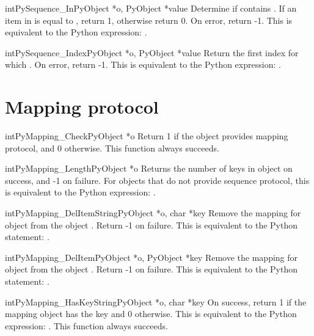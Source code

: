      \begin{cfuncdesc}{int}{PySequence_In}{PyObject *o, PyObject *value}
	 Determine if  contains .  If an item in  is equal to
	 , return 1, otherwise return 0.  On error, return -1.  This
	 is equivalent to the Python expression: .
     \end{cfuncdesc}

     \begin{cfuncdesc}{int}{PySequence_Index}{PyObject *o, PyObject *value}
	 Return the first index for which .  On error,
	 return -1.    This is equivalent to the Python
	 expression: .
     \end{cfuncdesc}

\section{Mapping protocol}

     \begin{cfuncdesc}{int}{PyMapping_Check}{PyObject *o}
         Return 1 if the object provides mapping protocol, and 0
	 otherwise.  
	 This function always succeeds.
     \end{cfuncdesc}


     \begin{cfuncdesc}{int}{PyMapping_Length}{PyObject *o}
         Returns the number of keys in object  on success, and -1 on
	 failure.  For objects that do not provide sequence protocol,
	 this is equivalent to the Python expression: .
     \end{cfuncdesc}


     \begin{cfuncdesc}{int}{PyMapping_DelItemString}{PyObject *o, char *key}
	 Remove the mapping for object  from the object .
	 Return -1 on failure.  This is equivalent to
	 the Python statement: .
     \end{cfuncdesc}


     \begin{cfuncdesc}{int}{PyMapping_DelItem}{PyObject *o, PyObject *key}
	 Remove the mapping for object  from the object .
	 Return -1 on failure.  This is equivalent to
	 the Python statement: .
     \end{cfuncdesc}


     \begin{cfuncdesc}{int}{PyMapping_HasKeyString}{PyObject *o, char *key}
	 On success, return 1 if the mapping object has the key 
	 and 0 otherwise.  This is equivalent to the Python expression:
	 . 
	 This function always succeeds.
     \end{cfuncdesc}


